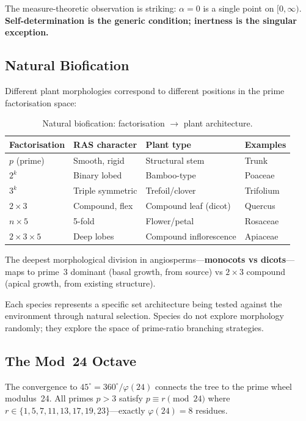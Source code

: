 \documentclass[11pt,a4paper]{article}
\begin{document}
The measure-theoretic observation is striking: $\alpha = 0$ is a single point on $[0, \infty)$. \textbf{Self-determination is the generic condition; inertness is the singular exception.}

\subsection{Natural Biofication}

Different plant morphologies correspond to different positions in the prime factorisation space:

\begin{table}[H]
\centering
\begin{tabular}{llll}
\toprule
\textbf{Factorisation} & \textbf{RAS character} & \textbf{Plant type} & \textbf{Examples} \\
\midrule
$p$ (prime) & Smooth, rigid & Structural stem & Trunk \\
$2^k$ & Binary lobed & Bamboo-type & Poaceae \\
$3^k$ & Triple symmetric & Trefoil/clover & Trifolium \\
$2\times3$ & Compound, flex & Compound leaf (dicot) & Quercus \\
$n\times5$ & 5-fold & Flower/petal & Rosaceae \\
$2\times3\times5$ & Deep lobes & Compound inflorescence & Apiaceae \\
\bottomrule
\end{tabular}
\caption{Natural biofication: factorisation $\to$ plant architecture.}
\label{tab:biofication}
\end{table}

The deepest morphological division in angiosperms---\textbf{monocots vs dicots}---maps to prime~3 dominant (basal growth, from source) vs $2\times3$ compound (apical growth, from existing structure).

Each species represents a specific set architecture being tested against the environment through natural selection. Species do not explore morphology randomly; they explore the space of prime-ratio branching strategies.

\subsection{The Mod~24 Octave}

The convergence to $45^\circ = 360^\circ/\varphi(24)$ connects the tree to the prime wheel modulus~24. All primes $p > 3$ satisfy $p \equiv r \pmod{24}$ where $r \in \{1, 5, 7, 11, 13, 17, 19, 23\}$---exactly $\varphi(24) = 8$ residues.
\end{document}

